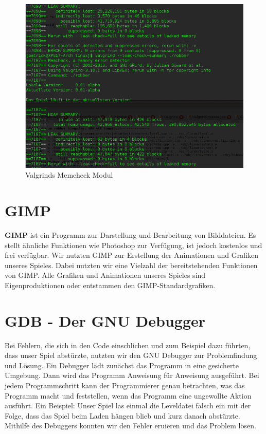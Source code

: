 \documentclass[11pt,a4paper]{scrbook}
\begin{document}
\begin{figure}
\centering
\includegraphics[scale=0.5]{img/valgrind2.png}
\caption{Valgrinds Memcheck Modul}
\end{figure}


\section{GIMP}
\textbf{GIMP} ist ein Programm zur Darstellung und Bearbeitung von Bilddateien.
Es stellt ähnliche Funktionen wie Photoshop zur Verfügung, ist jedoch kostenlos und frei verfügbar.
Wir nutzten GIMP zur Erstellung der Animationen und Grafiken unseres Spieles.
Dabei nutzten wir eine Vielzahl der bereitstehenden Funktionen von GIMP.
Alle Grafiken und Animationen unseres Spieles sind Eigenproduktionen oder entstammen den GIMP-Standardgrafiken.

\section{GDB - Der GNU Debugger}
Bei Fehlern, die sich in den Code einschlichen und zum Beispiel dazu führten, dass unser Spiel abstürzte, nutzten wir den GNU Debugger zur Problemfindung und Lösung. Ein Debugger lädt zunächst das Programm in eine gesicherte Umgebung. Dann wird das Programm Anweisung für Anweisung ausgeführt. Bei jedem Programmschritt kann der Programmierer genau betrachten, was das Programm macht und feststellen, wenn das Programm eine ungewollte Aktion ausführt. Ein Beispiel: Unser Spiel las einmal die Leveldatei falsch ein mit der Folge, dass das Spiel beim Laden hängen blieb und kurz danach abstürzte. Mithilfe des Debuggers konnten wir den Fehler eruieren und das Problem lösen. 
\end{document}
